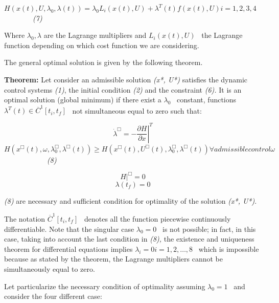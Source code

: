 \documentclass[a4paper]{article}
\begin{document}
 $H\left(x\left(t\right),U,\lambda _0,\lambda \left(t\right)\right)=\lambda _0L_i\left(x\left(t\right),U\right)+\lambda
^T\left(t\right)f\left(x\left(t\right),U\right)i=1,2,3,4$\ \ \ \ \ \ \ \ \textit{(7)}

Where  $\lambda _0,\lambda $ are the Lagrange multipliers and  $L_i\left(x\left(t\right),U\right)$ \ the Lagrange
function depending on which cost function we are considering. 

The general optimal solution is given by the following theorem.

\textbf{Theorem: }Let consider an admissible solution \textit{(x*, U*) }satisfies the dynamic control systems
\textit{(1)}, the initial condition \textit{(2) }and the constraint \textit{(6). }It is an optimal solution (global
minimum) if there exist a  $\lambda _0$ \ constant, functions  $\lambda ^T\left(t\right){\in}\overline
C^1\left[t_i,t_f\right]$ \ not simultaneous equal to zero such that:

\begin{equation*}
\dot{\lambda }^{\Box }=-\left.\frac{{\partial}H}{{\partial}x}\right|^T
\end{equation*}
 $H\left(x^{\Box }\left(t\right),\omega ,\lambda _0^{\Box },\lambda ^{\Box }\left(t\right)\right){\geq}H\left(x^{\Box
}\left(t\right),U^{\Box }\left(t\right),\lambda _0^{\Box },\lambda ^{\Box
}\left(t\right)\right){\forall}\mathit{admissible}\mathit{control}\omega $\ \  \ \ \ \ \ \ \ \ \ \ \textit{(8)}

\begin{equation*}
\left.H\right|^{\Box }=0
\end{equation*}
\begin{equation*}
\lambda \left(t_f\right)=0
\end{equation*}

\bigskip

\textit{(8)} are necessary and sufficient condition for optimality of the solution \textit{(x*, U*)}.

The notation  $\overline C^1\left[t_i,t_f\right]$ \ denotes all the function piecewise continuously differentiable. Note
that the singular case  $\lambda _0=0$ \ is not possible; in fact, in this case, taking into account the last condition
in \textit{(8), }the existence and uniqueness theorem for differential equations implies  $\lambda _i=0i=1,2,{\dots},8$
\ which is impossible because as stated by the theorem, the Lagrange multipliers cannot be simultaneously equal to
zero. 

Let particularize the necessary condition of optimality assuming  $\lambda _0=1$ \ and consider the four different case:
\end{document}
